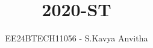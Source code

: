 \documentclass[journal]{IEEEtran}
\begin{document}

\vspace{3cm}

\title{2020-ST}
\author{EE24BTECH11056 - S.Kavya Anvitha}
{\let\newpage\relax\maketitle}

\renewcommand{\thefigure}{\theenumi}
\renewcommand{\thetable}{\theenumi}
\setlength{\intextsep}{10pt} %


\renewcommand{\thetable}{\theenumi}
\end{document}
